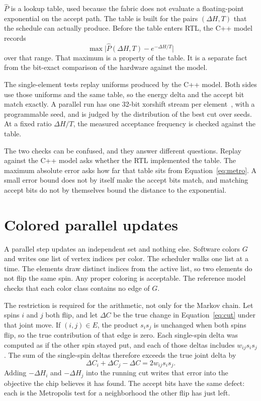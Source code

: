 \documentclass[10pt,twocolumn]{article}
\begin{document}
\(\hat{P}\) is a lookup table, used because the fabric does not evaluate a floating-point exponential on the accept path.
The table is built for the pairs \((\Delta H,T)\) that the schedule can actually produce.
Before the table enters RTL, the C++ model records
\[
\max\bigl|\hat{P}(\Delta H,T)-e^{-\Delta H/T}\bigr|
\]
over that range.
That maximum is a property of the table.
It is a separate fact from the bit-exact comparison of the hardware against the model.

The single-element tests replay uniforms produced by the C++ model.
Both sides use those uniforms and the same table, so the energy delta and the accept bit match exactly.
A parallel run has one 32-bit xorshift stream per element~\citep{marsaglia2003}, with a programmable seed, and is judged by the distribution of the best cut over seeds.
At a fixed ratio \(\Delta H/T\), the measured acceptance frequency is checked against the table.

The two checks can be confused, and they answer different questions.
Replay against the C++ model asks whether the RTL implemented the table.
The maximum absolute error asks how far that table sits from Equation~\eqref{eq:metro}.
A small error bound does not by itself make the accept bits match, and matching accept bits do not by themselves bound the distance to the exponential.

\section{Colored parallel updates}
\label{sec:parallel}

A parallel step updates an independent set and nothing else.
Software colors \(G\) and writes one list of vertex indices per color.
The scheduler walks one list at a time.
The elements draw distinct indices from the active list, so two elements do not flip the same spin.
Any proper coloring is acceptable.
The reference model checks that each color class contains no edge of \(G\).

The restriction is required for the arithmetic, not only for the Markov chain.
Let spins \(i\) and \(j\) both flip, and let \(\Delta C\) be the true change in Equation~\eqref{eq:cut} under that joint move.
If \((i,j)\in E\), the product \(s_i s_j\) is unchanged when both spins flip, so the true contribution of that edge is zero.
Each single-spin delta was computed as if the other spin stayed put, and each of those deltas includes \(w_{ij}s_i s_j\).
The sum of the single-spin deltas therefore exceeds the true joint delta by
\begin{equation}
\Delta C_i+\Delta C_j-\Delta C = 2 w_{ij} s_i s_j.
\label{eq:cross}
\end{equation}
Adding \(-\Delta H_i\) and \(-\Delta H_j\) into the running cut writes that error into the objective the chip believes it has found.
The accept bits have the same defect: each is the Metropolis test for a neighborhood the other flip has just left.
\end{document}
